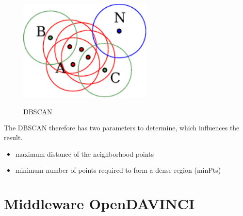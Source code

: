 \begin{figure}[!ht]
\begin{center}
\caption{\acs{DBSCAN}}
\includegraphics[width=0.6\textwidth]{bilder/dbscan.pdf}
\label{dbscan}
\end{center}
\end{figure}

The \ac {DBSCAN} therefore has two parameters to determine, which influences the result.
\begin{itemize}
 \item maximum distance of the neighborhood points
 \item minimum number of points required to form a dense region (minPts)
\end{itemize}

\section{Middleware OpenDAVINCI}

